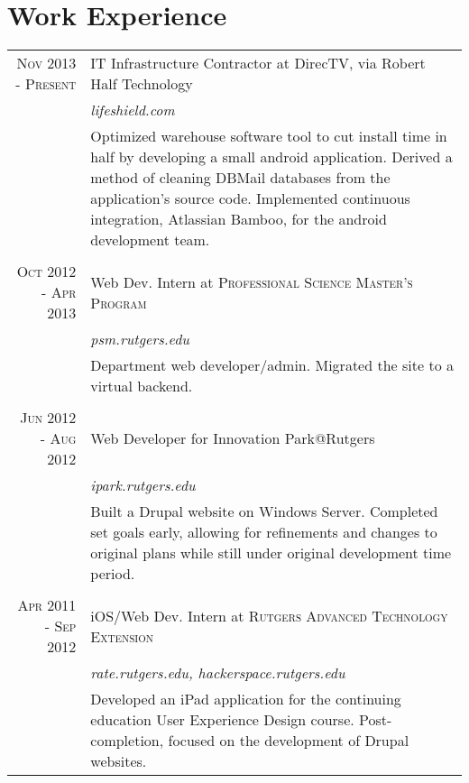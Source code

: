 \documentclass[a4paper,10pt, onepage]{article} %
\begin{document}
\section{Work Experience}
\begin{tabular}{r|p{10cm}}
\textsc{Nov 2013 - Present} & {IT Infrastructure Contractor at DirecTV, via Robert Half Technology}\\
&\small\emph{lifeshield.com}\\
&\footnotesize{Optimized warehouse software tool to cut install time in half by developing a small android application. Derived a method of cleaning DBMail databases from the application's source code. Implemented continuous integration, Atlassian Bamboo, for the android development team.}\\
\multicolumn{2}{c}{}\\

\textsc{Oct 2012 - Apr 2013} & Web Dev. Intern at \textsc{Professional Science Master's Program}\\
& \small\emph{psm.rutgers.edu}\\
& \footnotesize{Department web developer/admin. Migrated the site to a virtual backend.}\\
\multicolumn{2}{c}{} \\


\textsc{Jun 2012 - Aug 2012} & Web Developer for Innovation Park@Rutgers\\
& \small\emph{ipark.rutgers.edu}\\
& \footnotesize{Built a Drupal website on Windows Server. Completed set goals early, allowing for refinements and changes to original plans while still under original development time period.}\\
\multicolumn{2}{c}{}\\


\textsc{Apr 2011 - Sep 2012} & iOS/Web Dev. Intern at \textsc{Rutgers Advanced Technology Extension}\\
& \small\emph{rate.rutgers.edu, hackerspace.rutgers.edu}\\
& \footnotesize{Developed an iPad application for the continuing education User Experience Design course. Post-completion, focused on the development of Drupal websites.}
\end{tabular}

\end{document}
